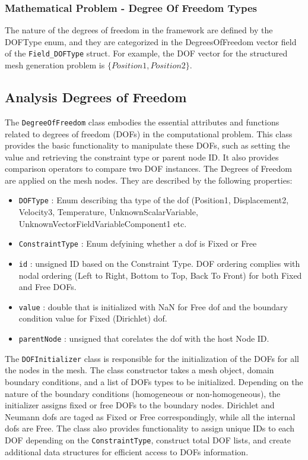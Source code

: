 \documentclass{article}
\begin{document}
	\subsubsection{Mathematical Problem - Degree Of Freedom Types}
	The nature of the degrees of freedom in the framework are defined by the DOFType enum, and they are categorized in the DegreesOfFreedom vector field of the \texttt{Field\_DOFType} struct. For example, the DOF vector for the structured mesh generation problem is $\{Position1, Position2\}$.
	
	\subsection{Analysis Degrees of Freedom}
	The \texttt{DegreeOfFreedom} class embodies the essential attributes and functions related to degrees of freedom (DOFs) in the computational problem. This class provides the basic functionality to manipulate these DOFs, such as setting the value and retrieving the constraint type or parent node ID. It also provides comparison operators to compare two DOF instances.
	The Degrees of Freedom are applied on the mesh nodes. They are described by the following properties:
	\begin{itemize}
		
		\item \texttt{DOFType} : Enum describing tha type of the dof (Position1, Displacement2, Velocity3, Temperature, UnknownScalarVariable, UnknownVectorFieldVariableComponent1 etc.
		
		\item \texttt{ConstraintType} : Enum defyining whether a dof is Fixed or Free
		
		\item \texttt{id} : unsigned ID based on the Constraint Type. DOF ordering complies with nodal ordering (Left to Right, Bottom to Top, Back To Front) for both Fixed and Free DOFs.
		
		\item \texttt{value} : double that is initialized with NaN for Free dof and the boundary condition value for Fixed (Dirichlet) dof.
		
		\item \texttt{parentNode} :  unsigned that corelates the dof with the host Node ID.
	\end{itemize}
	
	The \texttt{DOFInitializer} class is responsible for the initialization of the DOFs for all the nodes in the mesh. The class constructor takes a mesh object, domain boundary conditions, and a list of DOFs types to be initialized. Depending on the nature of the boundary conditions (homogeneous or non-homogeneous), the initializer assigns fixed or free DOFs to the boundary nodes. Dirichlet and Neumann dofs are taged as Fixed or Free correspondingly, while all the internal dofs are Free. The class also provides functionality to assign unique IDs to each DOF depending on the \texttt{ConstraintType}, construct total DOF lists, and create additional data structures for efficient access to DOFs information.
	
\end{document}

